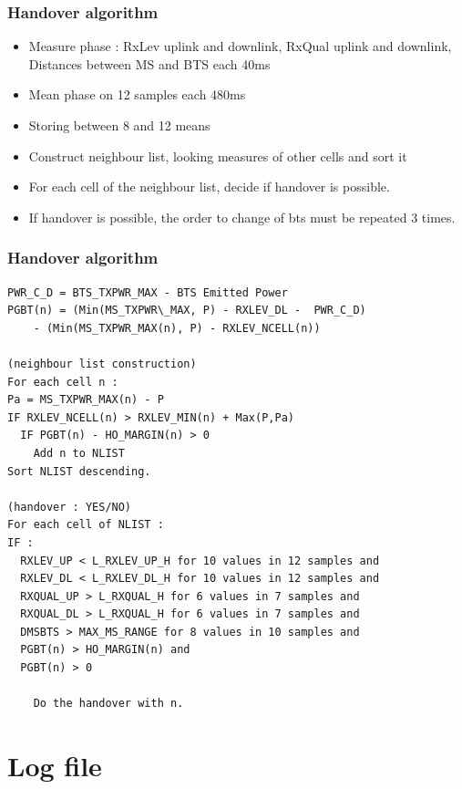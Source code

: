 \documentclass{beamer}
\begin{document}
\begin{frame}
\frametitle{Handover algorithm}
\begin{itemize}
  \item Measure phase : RxLev uplink and downlink, RxQual uplink and downlink, Distances between MS and BTS each 40ms
  \item Mean phase on 12 samples each 480ms
  \item Storing between 8 and 12 means
  \item Construct neighbour list, looking measures of other cells and sort it
  \item For each cell of the neighbour list, decide if handover is possible.
  \item If handover is possible, the order to change of bts must be repeated 3
times.
\end{itemize}
\end{frame}
\begin{frame}[fragile]
\frametitle{Handover algorithm}

{\tiny
\begin{verbatim}
PWR_C_D = BTS_TXPWR_MAX - BTS Emitted Power
PGBT(n) = (Min(MS_TXPWR\_MAX, P) - RXLEV_DL -  PWR_C_D)
    - (Min(MS_TXPWR_MAX(n), P) - RXLEV_NCELL(n))

(neighbour list construction)
For each cell n :
Pa = MS_TXPWR_MAX(n) - P
IF RXLEV_NCELL(n) > RXLEV_MIN(n) + Max(P,Pa)
  IF PGBT(n) - HO_MARGIN(n) > 0
    Add n to NLIST
Sort NLIST descending.

(handover : YES/NO)
For each cell of NLIST :
IF :
  RXLEV_UP < L_RXLEV_UP_H for 10 values in 12 samples and
  RXLEV_DL < L_RXLEV_DL_H for 10 values in 12 samples and
  RXQUAL_UP > L_RXQUAL_H for 6 values in 7 samples and 
  RXQUAL_DL > L_RXQUAL_H for 6 values in 7 samples and
  DMSBTS > MAX_MS_RANGE for 8 values in 10 samples and
  PGBT(n) > HO_MARGIN(n) and
  PGBT(n) > 0

    Do the handover with n.
\end{verbatim}
}

\end{frame}

\section{Log file}
\end{document}

